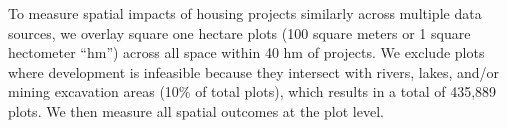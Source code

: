\documentclass[12pt]{article}
\begin{document}





To measure spatial impacts of housing projects similarly across multiple data sources, we overlay square one hectare plots (100 square meters or 1 square hectometer ``hm'') across all space within 40 hm of projects.  We exclude plots where development is infeasible because they intersect with rivers, lakes, and/or mining excavation areas (10\% of total plots), which results in a total of 435,889 plots.  We then measure all spatial outcomes at the plot level.
\end{document}
